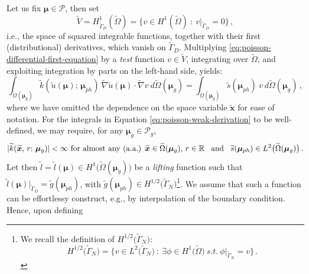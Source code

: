 \documentclass[12pt, a4paper, twoside, openright]{report}
\numberwithin{equation}{chapter}
\theoremstyle{theorem}
\theoremstyle{definition}
\theoremstyle{remark}
\theoremstyle{proposition}
\numberwithin{figure}{chapter}
\newcommand{\wt}[1]{\widetilde{#1}}
\newcommand{\bg}[1]{\boldsymbol{#1}}
\begin{document}
		Let us fix $\bg{\mu} \in \mathcal{P}$, then set 
		\begin{equation*}
			\wt{V} = H^1_{\wt{\Gamma}_D}(\wt{\Omega}) = \big\lbrace v \in H^1(\wt{\Omega}) ~ : ~ v \big\rvert_{\wt{\Gamma}_D} = 0 \big\rbrace \, ,
		\end{equation*}
		i.e., the space of squared integrable functions, together with their first (distributional) derivatives, which vanish on $\wt{\Gamma}_D$. Multiplying \eqref{eq:poisson-differential-first-equation} by a \emph{test} function $v \in \wt{V}$, integrating over $\wt{\Omega}$, and exploiting integration by parts on the left-hand side, yields:
		\begin{equation}
			\label{eq:poisson-weak-derivation}
			\int_{\wt{\Omega}(\bg{\mu}_g)} \wt{k}(\wt{u}(\bg{\mu}); \, \bg{\mu}_{ph}) ~ \wt{\nabla} \wt{u}(\bg{\mu}) \cdot \wt{\nabla} v ~ d\wt{\Omega}(\bg{\mu}_g) = \int_{\wt{\Omega}(\bg{\mu}_g)} \wt{s}(\bg{\mu}_{ph}) ~ v ~ d\wt{\Omega}(\bg{\mu}_g) \, ,
		\end{equation}
		where we have omitted the dependence on the space variable $\wt{\bg{x}}$ for ease of notation. For the integrals in Equation \eqref{eq:poisson-weak-derivation} to be well-defined, we may require, for any $\bg{\mu}_g \in \mathcal{P}_g$, 
		\begin{equation*}
			\text{$|\wt{k}(\wt{\bg{x}}, \, r; \, \bg{\mu}_g)| < \infty$ for almost any (a.a.) $\wt{\bg{x}} \in \wt{\Omega}(\bg{\mu}_g), \, r \in \mathbb{R}$}  \hspace*{0.3cm} \text{and} \hspace*{0.3cm} \wt{s}(\bg{\mu}_{ph}) \in L^2 \big( \wt{\Omega}(\bg{\mu}_g) \big) \, .
		\end{equation*}
		Let then $\wt{l} = \wt{l}(\bg{\mu}) \in H^1 \big( \wt{\Omega}(\bg{\mu}_g) \big)$ be a \emph{lifting} function such that $\wt{l}(\bg{\mu}) \big\rvert_{\wt{\Gamma}_D} = \wt{g}(\bg{\mu}_{ph})$, with $\wt{g}(\bg{\mu}_{ph}) \in H^{1/2} \big( \wt{\Gamma}_N \big)$\footnote{We recall the definition of $H^{1/2} \big( \wt{\Gamma}_N \big)$: \begin{equation*} H^{1/2} \big( \wt{\Gamma}_N \big) = \big\lbrace v \in L^2 \big( \wt{\Gamma}_N \big) ~ : ~ \exists \phi \in H^1 \big(\wt{\Omega} \big) ~ s.t. ~ \phi \big\rvert_{\wt{\Gamma}_N} = v \big\rbrace \, . \end{equation*}}. We assume that such a function can be effortlessy construct, e.g., by interpolation of the boundary condition. Hence, upon defining
\end{document}
